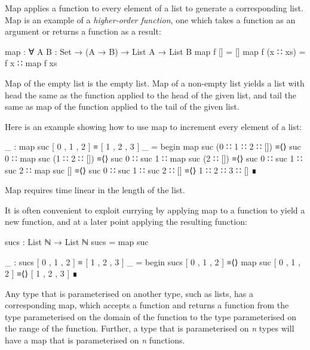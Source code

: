 Map applies a function to every element of a list to generate a
corresponding list. Map is an example of a \emph{higher-order function},
one which takes a function as an argument or returns a function as a
result:

\begin{fence}
\begin{code}
map : ∀ {A B : Set} → (A → B) → List A → List B
map f []        =  []
map f (x ∷ xs)  =  f x ∷ map f xs
\end{code}
\end{fence}

Map of the empty list is the empty list. Map of a non-empty list yields
a list with head the same as the function applied to the head of the
given list, and tail the same as map of the function applied to the tail
of the given list.

Here is an example showing how to use map to increment every element of
a list:

\begin{fence}
\begin{code}
_ : map suc [ 0 , 1 , 2 ] ≡ [ 1 , 2 , 3 ]
_ =
  begin
    map suc (0 ∷ 1 ∷ 2 ∷ [])
  ≡⟨⟩
    suc 0 ∷ map suc (1 ∷ 2 ∷ [])
  ≡⟨⟩
    suc 0 ∷ suc 1 ∷ map suc (2 ∷ [])
  ≡⟨⟩
    suc 0 ∷ suc 1 ∷ suc 2 ∷ map suc []
  ≡⟨⟩
    suc 0 ∷ suc 1 ∷ suc 2 ∷ []
  ≡⟨⟩
    1 ∷ 2 ∷ 3 ∷ []
  ∎
\end{code}
\end{fence}

Map requires time linear in the length of the list.

It is often convenient to exploit currying by applying map to a function
to yield a new function, and at a later point applying the resulting
function:

\begin{fence}
\begin{code}
sucs : List ℕ → List ℕ
sucs = map suc

_ : sucs [ 0 , 1 , 2 ] ≡ [ 1 , 2 , 3 ]
_ =
  begin
    sucs [ 0 , 1 , 2 ]
  ≡⟨⟩
    map suc [ 0 , 1 , 2 ]
  ≡⟨⟩
    [ 1 , 2 , 3 ]
  ∎
\end{code}
\end{fence}

Any type that is parameterised on another type, such as lists, has a
corresponding map, which accepts a function and returns a function from
the type parameterised on the domain of the function to the type
parameterised on the range of the function. Further, a type that is
parameterised on \emph{n} types will have a map that is parameterised on
\emph{n} functions.

